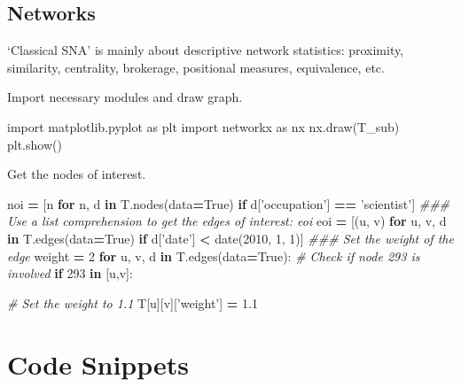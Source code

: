\documentclass[]{book}
\newenvironment{Shaded}{\begin{snugshade}}{\end{snugshade}}
\newcommand{\KeywordTok}[1]{\textcolor[rgb]{0.13,0.29,0.53}{\textbf{#1}}}
\newcommand{\DecValTok}[1]{\textcolor[rgb]{0.00,0.00,0.81}{#1}}
\newcommand{\FloatTok}[1]{\textcolor[rgb]{0.00,0.00,0.81}{#1}}
\newcommand{\StringTok}[1]{\textcolor[rgb]{0.31,0.60,0.02}{#1}}
\newcommand{\ImportTok}[1]{#1}
\newcommand{\CommentTok}[1]{\textcolor[rgb]{0.56,0.35,0.01}{\textit{#1}}}
\newcommand{\VariableTok}[1]{\textcolor[rgb]{0.00,0.00,0.00}{#1}}
\newcommand{\ControlFlowTok}[1]{\textcolor[rgb]{0.13,0.29,0.53}{\textbf{#1}}}
\newcommand{\OperatorTok}[1]{\textcolor[rgb]{0.81,0.36,0.00}{\textbf{#1}}}
\newcommand{\NormalTok}[1]{#1}
\theoremstyle{definition}
\theoremstyle{definition}
\theoremstyle{definition}
\theoremstyle{remark}
\begin{document}
\section{Networks}\label{networks}

`Classical SNA' is mainly about descriptive network statistics:
proximity, similarity, centrality, brokerage, positional measures,
equivalence, etc.

Import necessary modules and draw graph.

\begin{Shaded}
\begin{Highlighting}[]
\ImportTok{import}\NormalTok{ matplotlib.pyplot }\ImportTok{as}\NormalTok{ plt}
\ImportTok{import}\NormalTok{ networkx }\ImportTok{as}\NormalTok{ nx}
\NormalTok{nx.draw(T_sub)}
\NormalTok{plt.show()}
\end{Highlighting}
\end{Shaded}

Get the nodes of interest.

\begin{Shaded}
\begin{Highlighting}[]
\NormalTok{noi }\OperatorTok{=}\NormalTok{ [n }\ControlFlowTok{for}\NormalTok{ n, d }\KeywordTok{in}\NormalTok{ T.nodes(data}\OperatorTok{=}\VariableTok{True}\NormalTok{) }\ControlFlowTok{if}\NormalTok{ d[}\StringTok{'occupation'}\NormalTok{] }\OperatorTok{==} \StringTok{'scientist'}\NormalTok{]}
\CommentTok{### Use a list comprehension to get the edges of interest: eoi}
\NormalTok{eoi }\OperatorTok{=}\NormalTok{ [(u, v) }\ControlFlowTok{for}\NormalTok{ u, v, d }\KeywordTok{in}\NormalTok{ T.edges(data}\OperatorTok{=}\VariableTok{True}\NormalTok{) }\ControlFlowTok{if}\NormalTok{ d[}\StringTok{'date'}\NormalTok{] }\OperatorTok{<}\NormalTok{ date(}\DecValTok{2010}\NormalTok{, }\DecValTok{1}\NormalTok{, }\DecValTok{1}\NormalTok{)]}
\CommentTok{### Set the weight of the edge}
\NormalTok{weight }\OperatorTok{=} \DecValTok{2}
\ControlFlowTok{for}\NormalTok{ u, v, d }\KeywordTok{in}\NormalTok{ T.edges(data}\OperatorTok{=}\VariableTok{True}\NormalTok{):}
  \CommentTok{# Check if node 293 is involved}
  \ControlFlowTok{if} \DecValTok{293} \KeywordTok{in}\NormalTok{ [u,v]:}
    
    \CommentTok{# Set the weight to 1.1}
\NormalTok{    T[u][v][}\StringTok{'weight'}\NormalTok{] }\OperatorTok{=} \FloatTok{1.1}
\end{Highlighting}
\end{Shaded}

\chapter{Code Snippets}\label{code-snippets}
\end{document}
